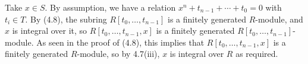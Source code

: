 Take $x \in S$. By assumption, we have a relation
 $x^n + t_{n-1} +\cdots + t_0 = 0$ with $t_i \in T$. By (4.8), the
 subring $R[t_0, \ldots, t_{n-1}]$ is a finitely generated $R$-module, and
 $x$ is integral over it, so $R[t_0, \ldots, t_{n-1}, x]$ is a finitely
 generated $R[t_0, \ldots, t_{n-1}]$-module. As seen in the proof of (4.8), this
 implies that $R[t_0, \ldots, t_{n-1}, x]$ is a finitely generated $R$-module,
 so by 4.7(iii), $x$ is integral over $R$ as required.
